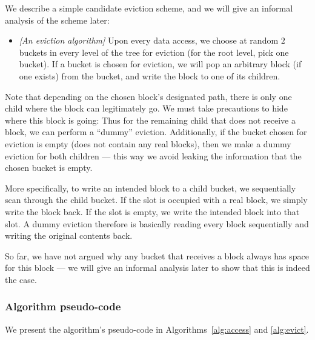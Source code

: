 We describe a simple candidate eviction scheme, and we will give an
informal analysis of the scheme later:

\begin{itemize}
\item
  \emph{{[}An eviction algorithm{]}} Upon every data access, we choose
  at random \(2\) buckets in every level of the tree for eviction (for
  the root level, pick one bucket). If a bucket is chosen for eviction,
  we will pop an arbitrary block (if one exists) from the bucket, and
  write the block to one of its children.
\end{itemize}

Note that depending on the chosen block's designated path, there is only
one child where the block can legitimately go. We must take precautions
to hide where this block is going: Thus for the remaining child that
does not receive a block, we can perform a ``dummy'' eviction.
Additionally, if the bucket chosen for eviction is empty (does not
contain any real blocks), then we make a dummy eviction for both
children --- this way we avoid leaking the information that the chosen
bucket is empty.

More specifically, to write an intended block to a child bucket, we
sequentially scan through the child bucket. If the slot is occupied with
a real block, we simply write the block back. If the slot is empty, we
write the intended block into that slot. A dummy eviction therefore is
basically reading every block sequentially and writing the original
contents back.

So far, we have not argued why any bucket that receives a block always
has space for this block --- we will give an informal analysis later to
show that this is indeed the case.

\subsubsection{Algorithm pseudo-code}\label{algorithm-pseudo-code.}

We present the algorithm's pseudo-code in Algorithms~\ref{alg:access}
and \ref{alg:evict}.

